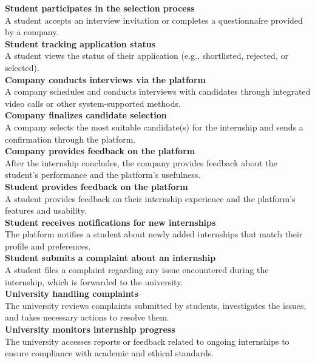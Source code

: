 \textbf{Student participates in the selection process}\\
A student accepts an interview invitation or completes a questionnaire provided by a company.\\

\textbf{Student tracking application status}\\
A student views the status of their application (e.g., shortlisted, rejected, or selected).\\

\textbf{Company conducts interviews via the platform}\\
A company schedules and conducts interviews with candidates through integrated video calls or other system-supported methods.\\

\textbf{Company finalizes candidate selection}\\
A company selects the most suitable candidate(s) for the internship and sends a confirmation through the platform.\\

\textbf{Company provides feedback on the platform}\\
After the internship concludes, the company provides feedback about the student’s performance and the platform’s usefulness.\\

\textbf{Student provides feedback on the platform}\\
A student provides feedback on their internship experience and the platform’s features and usability.\\

\textbf{Student receives notifications for new internships}\\
The platform notifies a student about newly added internships that match their profile and preferences.\\

\textbf{Student submits a complaint about an internship}\\
A student files a complaint regarding any issue encountered during the internship, which is forwarded to the university.\\

\textbf{University handling complaints}\\
The university reviews complaints submitted by students, investigates the issues, and takes necessary actions to resolve them.\\

\textbf{University monitors internship progress}\\
The university accesses reports or feedback related to ongoing internships to ensure compliance with academic and ethical standards.\\

